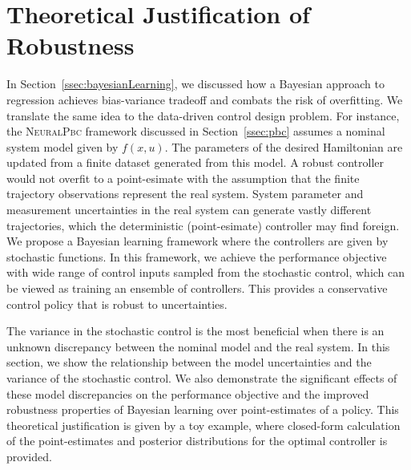 \section{Theoretical Justification of Robustness}
\label{sec:bl_justification}

In Section~\ref{ssec:bayesianLearning}, we discussed how a Bayesian approach to regression achieves bias-variance tradeoff and combats the risk of overfitting. 
%
We translate the same idea to the data-driven control design problem.
%
For instance, the \textsc{NeuralPbc} framework discussed in Section~\ref{ssec:pbc} assumes a nominal system model given by $f(x, u)$.
%
The parameters of the desired Hamiltonian are updated from a finite dataset generated from this model.
%
A robust controller would not overfit to a point-esimate with the assumption that the finite trajectory observations represent the real system. 
%
System parameter and measurement uncertainties in the real system can generate vastly different trajectories, which the deterministic (point-esimate) controller may find foreign.
%
We propose a Bayesian learning framework where the controllers are given by stochastic functions.
%
In this framework, we achieve the performance objective with wide range of control inputs sampled from the stochastic control, which can be viewed as training an ensemble of controllers.
%
This provides a conservative control policy that is robust to uncertainties.


The variance in the stochastic control is the most beneficial when there is an unknown discrepancy between the nominal model and the real system.
%
In this section, we show the relationship between the model uncertainties and the variance of the stochastic control.
%
We also demonstrate the significant effects of these model discrepancies on the performance objective and the improved robustness properties of Bayesian
learning over point-estimates of a policy. This theoretical justification is
given by a toy example, where closed-form calculation of the point-estimates and
posterior distributions for the optimal controller is provided.


